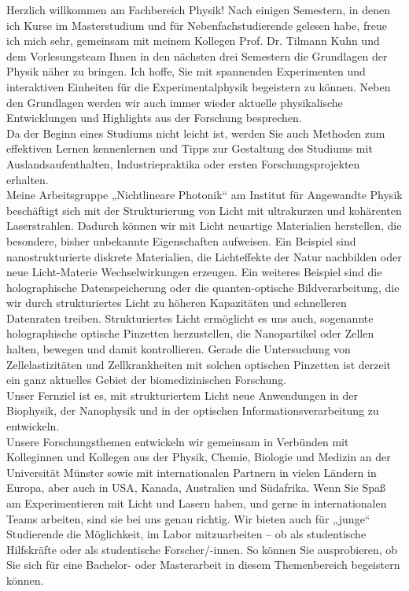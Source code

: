 \begin{multicols}{2}
\begin{footnotesize}
Herzlich willkommen am Fachbereich Physik! Nach einigen Semestern, in denen ich Kurse im Masterstudium und für Nebenfachstudierende gelesen habe, freue ich mich sehr, gemeinsam mit meinem Kollegen Prof. Dr. Tilmann Kuhn und dem Vorlesungsteam Ihnen in den nächsten drei Semestern die Grundlagen der Physik näher zu bringen. Ich hoffe, Sie mit spannenden Experimenten und interaktiven Einheiten für die Experimentalphysik begeistern zu können. Neben den Grundlagen werden wir auch immer wieder aktuelle physikalische Entwicklungen und Highlights aus der Forschung besprechen.\\
Da der Beginn eines Studiums nicht leicht ist, werden Sie auch Methoden zum effektiven Lernen kennenlernen und Tipps zur Gestaltung des Studiums mit Auslandsaufenthalten, Industriepraktika oder ersten Forschungsprojekten erhalten.
\\[1.5ex]
Meine Arbeitsgruppe „Nichtlineare Photonik“ am Institut für Angewandte Physik beschäftigt sich mit der Strukturierung von Licht mit ultrakurzen und kohärenten Laserstrahlen. Dadurch können wir mit Licht neuartige Materialien herstellen, die besondere, bisher unbekannte Eigenschaften aufweisen. Ein Beispiel sind nanostrukturierte diskrete Materialien, die Lichteffekte der Natur nachbilden oder neue Licht-Materie Wechselwirkungen erzeugen. Ein weiteres Beispiel sind die holographische Datenspeicherung oder die quanten-optische Bildverarbeitung, die wir durch strukturiertes Licht zu höheren Kapazitäten und schnelleren Datenraten treiben. Strukturiertes Licht ermöglicht es uns auch, sogenannte holographische optische Pinzetten herzustellen, die Nanopartikel oder Zellen halten, bewegen und damit kontrollieren. Gerade die Untersuchung von Zellelastizitäten und Zellkrankheiten mit solchen optischen Pinzetten ist derzeit ein ganz aktuelles Gebiet der biomedizinischen Forschung.
\\[1.5ex]
Unser Fernziel ist es, mit strukturiertem Licht neue Anwendungen in der Biophysik, der Nanophysik und in der optischen Informationsverarbeitung zu entwickeln.
\\[1.5ex]
Unsere Forschungsthemen entwickeln wir gemeinsam in Verbünden mit Kolleginnen und Kollegen aus der Physik, Chemie, Biologie und Medizin an der Universität Münster sowie mit internationalen Partnern in vielen Ländern in Europa, aber auch in USA, Kanada, Australien und Südafrika. Wenn Sie Spaß am Experimentieren mit Licht und Lasern haben, und gerne in internationalen Teams arbeiten, sind sie bei uns genau richtig. Wir bieten auch für „junge“ Studierende die Möglichkeit, im Labor mitzuarbeiten – ob als studentische Hilfskräfte oder als studentische Forscher/-innen. So können Sie ausprobieren, ob Sie sich für eine Bachelor- oder Masterarbeit in diesem Themenbereich begeistern können.

\end{footnotesize}
\end{multicols}
